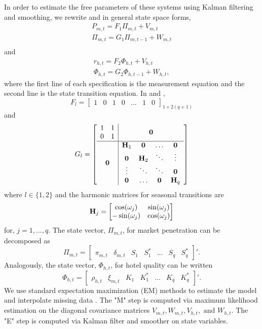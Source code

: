 \documentclass[mksc,blindrev]{informs3} %
\begin{document}
In order to estimate the free parameters of these systems using Kalman filtering and smoothing, we rewrite  and  in general state space forms,
\begin{equation}\label{eq:penetration_dlm_ssm}
\begin{split}
P_{m,t} = F_1\Pi_{m,t}+V_{m,t} \\
\Pi_{m,t} = G_1\Pi_{m,t-1}+W_{m,t} \\
\end{split}
\end{equation}
and
\begin{equation}\label{eq:ratings_dlm_ssm}
\begin{split}
r_{h,t} = F_2\Phi_{h,t}+V_{h,t} \\
\Phi_{h,t} = G_2\Phi_{h,t-1}+W_{h,t},
\end{split}
\end{equation}
where the first line of each specification is the measurement equation and the second line is the state transition equation. In  and , 
$$
F_l=\begin{bmatrix}
1 & 0 & 1 & 0 &...& 1 & 0
\end{bmatrix}_{1\times 2(q+1)}
$$ and 
$$
G_l=
\left[
\begin{array}{c|c}
\begin{matrix}
1&1\\		
0&1
\end{matrix}& \bold{0} \\
\hline
\bold{0} & \begin{matrix}
\bold{H}_1 & \bold{0} & \dots& \bold{0} \\
\bold{0} & \bold{H}_2 & \ddots & \vdots \\
\vdots &\ddots & \ddots & \bold{0} \\
\bold{0} &\dots & \bold{0} & \bold{H}_q
\end{matrix}
\end{array}
\right]
$$
where $l\in \{ 1, 2 \}$ and the harmonic matrices for seasonal transitions are
$$
\bold{H}_j=
\begin{bmatrix}
\cos(\omega_j) & \sin(\omega_j) \\
-\sin(\omega_j) & \cos(\omega_j)
\end{bmatrix}
$$
for, $j=1,...,q$. The state vector, $\Pi_{m,t}$, for market penetration can be decomposed as 
$$
\Pi_{m,t} = \begin{bmatrix}
\pi_{m, t} & \delta_{m,t} & S_1 & S_1^{*} & ... & S_q&S_q^{*}
\end{bmatrix}'.
$$
Analogously, the state vector, $\Phi_{h,t}$, for hotel quality can be written 
$$
\Phi_{h,t} = \begin{bmatrix}
\rho_{h, t} & \xi_{m,t} & K_1 & K_1^{*} & ... & K_q&K_q^{*}
\end{bmatrix}'.
$$
We use standard expectation maximization (EM) methods to estimate the model and interpolate missing data . The "M" step is computed via maximum likelihood estimation on the diagonal covariance matrices $V_{m,t}, W_{m,t}, V_{h,t}, \text{ and }W_{h,t}$. The "E" step is computed via Kalman filter and smoother on state variables.
\end{document}
